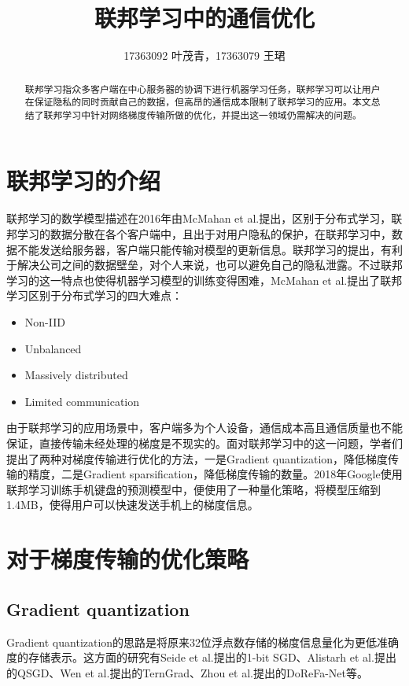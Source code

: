 \documentclass[12pt,onecolumn,letterpaper]{article}
\begin{document}
    \title{联邦学习中的通信优化}
    \author{17363092 叶茂青，17363079 王珺}

    \maketitle
    \begin{abstract}
        联邦学习指众多客户端在中心服务器的协调下进行机器学习任务，联邦学习可以让用户在保证隐私的同时贡献自己的数据，但高昂的通信成本限制了联邦学习的应用。本文总结了联邦学习中针对网络梯度传输所做的优化，并提出这一领域仍需解决的问题。
    \end{abstract}

    \section{联邦学习的介绍}
    联邦学习的数学模型描述在2016年由McMahan et al.\cite{McMahan2016}提出，区别于分布式学习，联邦学习的数据分散在各个客户端中，且出于对用户隐私的保护，在联邦学习中，数据不能发送给服务器，客户端只能传输对模型的更新信息。联邦学习的提出，有利于解决公司之间的数据壁垒，对个人来说，也可以避免自己的隐私泄露。不过联邦学习的这一特点也使得机器学习模型的训练变得困难，McMahan et al.\cite{McMahan2016}提出了联邦学习区别于分布式学习的四大难点：
    
    \begin{itemize}
        \item Non-IID
        \item Unbalanced
        \item Massively distributed
        \item Limited communication
    \end{itemize}
    
    由于联邦学习的应用场景中，客户端多为个人设备，通信成本高且通信质量也不能保证，直接传输未经处理的梯度是不现实的。面对联邦学习中的这一问题，学者们提出了两种对梯度传输进行优化的方法，一是Gradient quantization，降低梯度传输的精度，二是Gradient sparsification，降低梯度传输的数量。2018年Google\cite{Hard2018}使用联邦学习训练手机键盘的预测模型中，便使用了一种量化策略，将模型压缩到1.4MB，使得用户可以快速发送手机上的梯度信息。


    \section{对于梯度传输的优化策略}

    \subsection{Gradient quantization}
    Gradient quantization的思路是将原来32位浮点数存储的梯度信息量化为更低准确度的存储表示。这方面的研究有Seide et al.\cite{Seide2014}提出的1-bit SGD、Alistarh et al.\cite{Alistarh}提出的QSGD、Wen et al.\cite{Wen}提出的TernGrad、Zhou et al.\cite{Zhou}提出的DoReFa-Net等。
    
\end{document}
